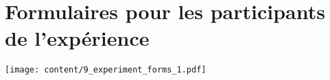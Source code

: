\chapter{Formulaires pour les participants de l'expérience}
\label{appendix:experiment_forms}

\texttt{[image: content/9\_experiment\_forms\_1.pdf]}


